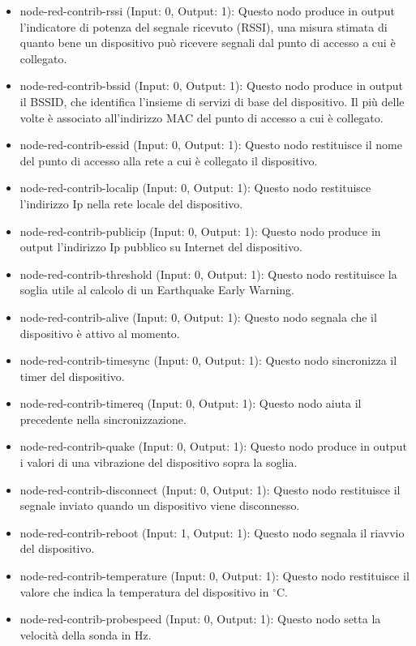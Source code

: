 \documentclass[a4paper,10pt]{memoir}
\begin{document}
\begin{itemize}
    \item node-red-contrib-rssi (Input: 0, Output: 1): Questo nodo produce in output l'indicatore di potenza del segnale ricevuto (RSSI), una misura stimata di quanto bene un dispositivo può ricevere segnali dal punto di accesso a cui è collegato.
    \item node-red-contrib-bssid (Input: 0, Output: 1): Questo nodo produce in output il BSSID, che identifica l'insieme di servizi di base del dispositivo. Il più delle volte è associato all'indirizzo MAC del punto di accesso a cui è collegato.
    \item node-red-contrib-essid (Input: 0, Output: 1): Questo nodo restituisce il nome del punto di accesso alla rete a cui è collegato il dispositivo.
    \item node-red-contrib-localip (Input: 0, Output: 1): Questo nodo restituisce l'indirizzo Ip nella rete locale del dispositivo.
    \item node-red-contrib-publicip (Input: 0, Output: 1): Questo nodo produce in output l'indirizzo Ip pubblico su Internet del dispositivo.
    \item node-red-contrib-threshold (Input: 0, Output: 1): Questo nodo restituisce la soglia utile al calcolo di un Earthquake Early Warning.
    \item node-red-contrib-alive (Input: 0, Output: 1): Questo nodo segnala che il dispositivo è attivo al momento. 
    \item node-red-contrib-timesync (Input: 0, Output: 1): Questo nodo sincronizza il timer del dispositivo.
    \item node-red-contrib-timereq (Input: 0, Output: 1): Questo nodo aiuta il precedente nella sincronizzazione.
    \item node-red-contrib-quake (Input: 0, Output: 1): Questo nodo produce in output i valori di una vibrazione del dispositivo sopra la soglia. 
    \item node-red-contrib-disconnect (Input: 0, Output: 1): Questo nodo restituisce il segnale inviato quando un dispositivo viene disconnesso.
    \item node-red-contrib-reboot (Input: 1, Output: 1): Questo nodo segnala il riavvio del dispositivo. 
    \item node-red-contrib-temperature (Input: 0, Output: 1): Questo nodo restituisce il valore che indica la temperatura del dispositivo in $^{\circ}$C.
    \item node-red-contrib-probespeed (Input: 0, Output: 1): Questo nodo setta la velocità della sonda in Hz.

\end{itemize}
\end{document}
